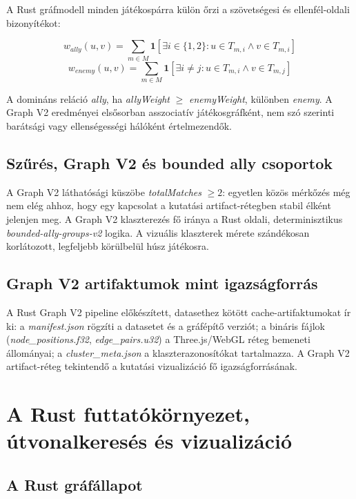 A Rust gráfmodell minden játékospárra külön őrzi a szövetségesi és ellenfél-oldali bizonyítékot:

\begin{equation}
w_{ally}(u,v)=\sum_{m \in M}\mathbf{1}[\exists i \in \{1,2\}: u \in T_{m,i} \land v \in T_{m,i}]
\end{equation}
\begin{equation}
w_{enemy}(u,v)=\sum_{m \in M}\mathbf{1}[\exists i \neq j: u \in T_{m,i} \land v \in T_{m,j}]
\end{equation}

A domináns reláció \textit{ally}, ha \textit{allyWeight} $\geq$ \textit{enemyWeight}, különben \textit{enemy}. A Graph V2 eredményei elsősorban asszociatív játékosgráfként, nem szó szerinti barátsági vagy ellenségességi hálóként értelmezendők.

\section{Szűrés, Graph V2 és bounded ally csoportok}

A Graph V2 láthatósági küszöbe \textit{totalMatches} $\geq 2$: egyetlen közös mérkőzés még nem elég ahhoz, hogy egy kapcsolat a kutatási artifact-rétegben stabil élként jelenjen meg. A Graph V2 klaszterezés fő iránya a Rust oldali, determinisztikus \textit{bounded-ally-groups-v2} logika. A vizuális klaszterek mérete szándékosan korlátozott, legfeljebb körülbelül húsz játékosra.

\section{Graph V2 artifaktumok mint igazságforrás}

A Rust Graph V2 pipeline előkészített, datasethez kötött cache-artifaktumokat ír ki: a \textit{manifest.json} rögzíti a datasetet és a gráfépítő verziót; a bináris fájlok (\textit{node\_positions.f32}, \textit{edge\_pairs.u32}) a Three.js/WebGL réteg bemeneti állományai; a \textit{cluster\_meta.json} a klaszterazonosítókat tartalmazza. A Graph V2 artifact-réteg tekintendő a kutatási vizualizáció fő igazságforrásának.

\chapter{A Rust futtatókörnyezet, útvonalkeresés és vizualizáció}

\section{A Rust gráfállapot}

